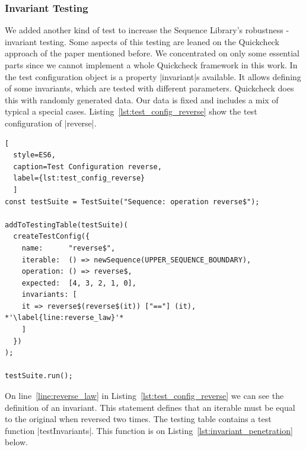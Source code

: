 \subsubsection{Invariant Testing}
\label{subsub:Invariant Testing}
We added another kind of test to increase the Sequence Library's robustness -
invariant testing. Some aspects of this testing are leaned on the Quickcheck
approach of the paper mentioned before. We concentrated on only some essential
parts since we cannot implement a whole Quickcheck framework in this work.
\newline
In the test configuration object
is a property |invariant|s available. It allows defining of some invariants, which are
tested with different parameters. Quickcheck does this with randomly generated
data. Our data is fixed and includes a mix of typical a special cases.
\newline
Listing~\ref{lst:test_config_reverse} show the test configuration of |reverse|.

\begin{lstlisting}[
  style=ES6, 
  caption=Test Configuration reverse,
  label={lst:test_config_reverse}
  ]
const testSuite = TestSuite("Sequence: operation reverse$");

addToTestingTable(testSuite)(
  createTestConfig({
    name:      "reverse$",
    iterable:  () => newSequence(UPPER_SEQUENCE_BOUNDARY),
    operation: () => reverse$,
    expected:  [4, 3, 2, 1, 0],
    invariants: [
    it => reverse$(reverse$(it)) ["=="] (it), *'\label{line:reverse_law}'*
    ]
  })
);

testSuite.run();
\end{lstlisting}
On line~\ref{line:reverse_law} in Listing~\ref{lst:test_config_reverse} we can 
see the definition of an invariant. This statement defines that an iterable must be 
equal to the original when reversed two times.
\newline
The testing table contains a test function |testInvariants|. This function is on
Listing~\ref{lst:invariant_penetration} below.

